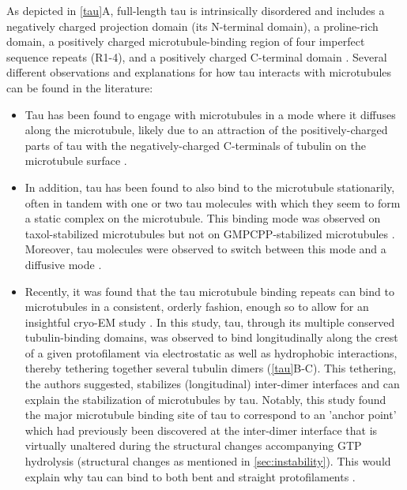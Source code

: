 As depicted in \autoref{tau}A, full-length tau is intrinsically disordered and includes a negatively charged projection domain (its N-terminal domain), a proline-rich domain, a positively charged microtubule-binding region of four imperfect sequence repeats (R1-4), and a positively charged C-terminal domain \parencite{Himmler1381}. Several different observations and explanations for how tau interacts with microtubules can be found in the literature: 
\begin{itemize}
	\item Tau has been found to engage with microtubules in a mode where it diffuses along the microtubule, likely due to an attraction of the positively-charged parts of tau with the negatively-charged C-terminals of tubulin on the microtubule surface \parencite{Hinrichs2012b}.
	\item In addition, tau has been found to also bind to the microtubule stationarily, often in tandem with one or two tau molecules with which they seem to form a static complex on the microtubule. This binding mode was observed on taxol-stabilized microtubules but not on GMPCPP-stabilized microtubules . Moreover, tau molecules were observed to switch between this mode and a diffusive mode .
	\item Recently, it was found that the tau microtubule binding repeats can bind to microtubules in a consistent, orderly fashion, enough so to allow for an insightful cryo-EM study \parencite{Kellogg2018}. In this study, tau, through its multiple conserved tubulin-binding domains, was observed to bind longitudinally along the crest of a given protofilament via electrostatic as well as hydrophobic interactions, thereby tethering together several tubulin dimers (\autoref{tau}B-C). This tethering, the authors suggested, stabilizes (longitudinal) inter-dimer interfaces and can explain the stabilization of microtubules by tau. Notably, this study found the major microtubule binding site of tau to correspond to an 'anchor point' which had previously been discovered  at the inter-dimer interface that is virtually unaltered during the structural changes accompanying GTP hydrolysis (structural changes as mentioned in \autoref{sec:instability}). This would explain why tau can bind to both bent and straight protofilaments \parencite{Kellogg2018}. 

\end{itemize}
